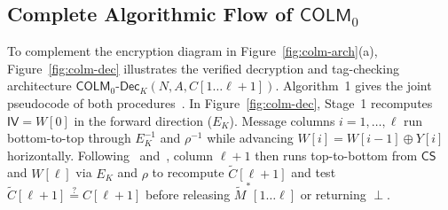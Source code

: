 \documentclass[11pt,a4paper]{article}
\theoremstyle{definition}
\theoremstyle{remark}
\newcommand{\COLMzero}{\mathsf{COLM}_0}
\newcommand{\IV}{\mathsf{IV}}
\newcommand{\CS}{\mathsf{CS}}
\begin{document}
\subsection{Complete Algorithmic Flow of \texorpdfstring{$\COLMzero$}{COLM\_0}}
To complement the encryption diagram in Figure~\ref{fig:colm-arch}(a), Figure~\ref{fig:colm-dec} illustrates the verified decryption and tag-checking architecture $\mathsf{COLM}_0\text{-}\mathsf{Dec}_K(N, A, C[1 \dots \ell+1])$. Algorithm~1 gives the joint pseudocode of both procedures~\cite[Sections~1.4--1.5, pp.~4--8]{COLMv1}. In Figure~\ref{fig:colm-dec}, Stage~1 recomputes $\IV = W[0]$ in the forward direction ($E_K$). Message columns $i = 1, \dots, \ell$ run bottom-to-top through $E_K^{-1}$ and $\rho^{-1}$ while advancing $W[i] = W[i-1] \oplus Y[i]$ horizontally. Following~\cite[Section~1.5.3, p.~8]{COLMv1} and~\cite[Figure~3, p.~12]{COLM24}, column $\ell+1$ then runs top-to-bottom from $\CS$ and $W[\ell]$ via $E_K$ and $\rho$ to recompute $\tilde{C}[\ell+1]$ and test $\tilde{C}[\ell+1] \stackrel{?}{=} C[\ell+1]$ before releasing $\tilde{M}^*[1 \dots \ell]$ or returning $\perp$.
\end{document}
